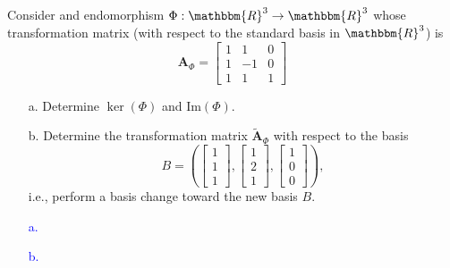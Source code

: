 \documentclass[a4paper,12pt]{article}
\newcommand{\R}{\mathbbm{R}}
\newcommand{\M}[1]{ \begin{bmatrix} #1 \end{bmatrix} }
\newcommand{\matA}{\textbf{A}}
\newcommand{\image}{\textrm{Im}}
\begin{document}
\subsection{}
Consider and endomorphism $\Phi: \R^3 \rightarrow \R^3$ whose transformation matrix (with respect to the standard basis in $\R ^3$) is 
$$\matA_\Phi = \M{1&1&0\\1&-1&0\\1&1&1}$$
\begin{itemize}
 \item [a.] Determine $\ker(\Phi)$ and $\image(\Phi)$.
 \item [b.] Determine the transformation matrix $\tilde{\matA}_\Phi$ with respect to the basis 
 $$B = \left( \M{1\\1\\1}, \M{1\\2\\1}, \M{1\\0\\0} \right),$$
 i.e., perform a basis change toward the new basis $B$.
\end{itemize}
\textcolor{blue}{
\begin{itemize}
 \item [a.] 
 \item [b.] 
\end{itemize}
}
\end{document}
